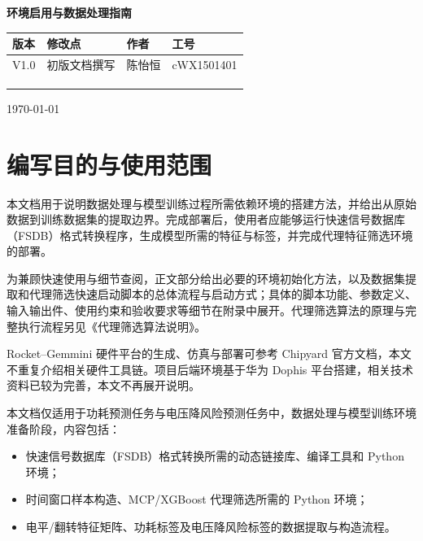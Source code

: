 \documentclass{fduthesis}
\begin{document}
\frontmatter
\begin{titlepage}
  \centering
  \vspace*{2.5cm}
  {\bfseries 环境启用与数据处理指南\par}
  \vfill
  {
  \renewcommand{\arraystretch}{1.5}
  \begin{tabular}{|L{0.12\textwidth}|L{0.40\textwidth}|L{0.14\textwidth}|L{0.14\textwidth}|}
    \hline
    版本 & 修改点 & 作者 & 工号 \\
    \hline
    V1.0 & 初版文档撰写 & 陈怡恒 & cWX1501401 \\
    \hline
    \rule{0pt}{2.2em} & & & \\
    \hline
    \rule{0pt}{2.2em} & & & \\
    \hline
    \rule{0pt}{2.2em} & & & \\
    \hline
  \end{tabular}\par}
  \vspace{1.5cm}
  {\today\par}
\end{titlepage}
\tableofcontents
\mainmatter

\chapter{编写目的与使用范围}

本文档用于说明数据处理与模型训练过程所需依赖环境的搭建方法，并给出从原始数据到训练数据集的提取边界。完成部署后，使用者应能够运行快速信号数据库（FSDB）格式转换程序，生成模型所需的特征与标签，并完成代理特征筛选环境的部署。

为兼顾快速使用与细节查阅，正文部分给出必要的环境初始化方法，以及数据集提取和代理筛选快速启动脚本的总体流程与启动方式；具体的脚本功能、参数定义、输入输出件、使用约束和验收要求等细节在附录中展开。代理筛选算法的原理与完整执行流程另见《代理筛选算法说明》。

Rocket--Gemmini 硬件平台的生成、仿真与部署可参考 Chipyard 官方文档，本文不重复介绍相关硬件工具链。项目后端环境基于华为 Dophis 平台搭建，相关技术资料已较为完善，本文不再展开说明。

本文档仅适用于功耗预测任务与电压降风险预测任务中，数据处理与模型训练环境准备阶段，内容包括：

\begin{itemize}
  \item 快速信号数据库（FSDB）格式转换所需的动态链接库、编译工具和 Python 环境；
  \item 时间窗口样本构造、MCP/XGBoost 代理筛选所需的 Python 环境；
  \item 电平/翻转特征矩阵、功耗标签及电压降风险标签的数据提取与构造流程。
\end{itemize}
\end{document}
